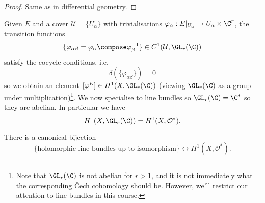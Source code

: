 \documentclass[a4paper]{article}
\begin{document}
\begin{proof}
  Same as in differential geometry.
\end{proof}

Given \(E\) and a cover \(\mathcal U = \{U_\alpha\}\) with trivialisations \(\varphi_\alpha: E|_{U_\alpha} \to U_\alpha \times \C^r\), the transition functions
\[
  \{\varphi_{\alpha\beta} = \varphi_\alpha \compose \varphi_\beta^{-1}\} \in C^1(\mathcal U, \GL_r(\C))
\]
satisfy the cocycle conditions, i.e.
\[
  \delta(\{\varphi_{\alpha\beta}\}) = 0
\]
so we obtain an element \([\varphi^E] \in H^1(X, \GL_r(\C))\) (viewing \(\GL_r(\C)\) as a group under multiplication)\footnote{Note that \(\GL_r(\C)\) is not abelian for \(r > 1\), and it is not immediately what the corresponding Čech cohomology should be. However, we'll restrict our attention to line bundles in this course.}. We now specialise to line bundles so \(\GL_r(\C) = \C^*\) so they are abelian. In particular we have
\[
  H^1(X, \GL_r(\C)) = H^1(X, \mathcal O^*).
\]

\begin{proposition}
  There is a canonical bijection
  \[
    \{\text{holomorphic line bundles up to isomorphism}\} \leftrightarrow H^1(X, \mathcal O^*).
  \]
\end{proposition}
\end{document}

